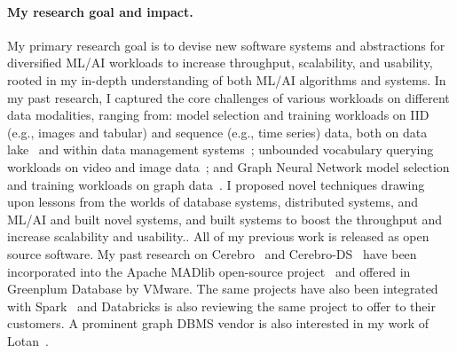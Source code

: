 \documentclass[letterpaper]{article}
\begin{document}
\paragraph{My research goal and impact.} My primary research goal is to devise new software systems and abstractions for diversified ML/AI workloads to increase throughput, scalability, and usability, rooted in my in-depth understanding of both ML/AI algorithms and systems. In my past research, I captured the core challenges of various workloads on different data modalities, ranging from: model selection and training workloads on IID (e.g., images and tabular) and sequence (e.g., time series) data, both on data lake~\cite{cerebro} and within data management systems~\cite{cerebro-ds}; unbounded vocabulary querying workloads on video and image data~\cite{panorama}; and Graph Neural Network model selection and training workloads on graph data~\cite{lotan}. I proposed novel techniques drawing upon lessons from the worlds of database systems, distributed systems, and ML/AI and built novel systems, and built systems to boost the throughput and increase scalability and usability.. All of my previous work is released as open source software. My past research on Cerebro~\cite{cerebro} and Cerebro-DS~\cite{cerebro-ds} have been incorporated into the Apache MADlib open-source project~\cite{madlibmop} and offered in Greenplum Database by VMware. The same projects have also been integrated with Spark~\cite{sparkmop} and Databricks is also reviewing the same project to offer to their customers. A prominent graph DBMS vendor is also interested in my work of Lotan~\cite{lotan}.



%
%
%
%
%
%
%
%
%
%
%
%
\end{document}
